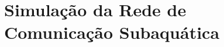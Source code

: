 \section{Simulação da Rede de Comunicação Subaquática}
\label{sec:simulacao-rede-comunicacao-subaquatica}
